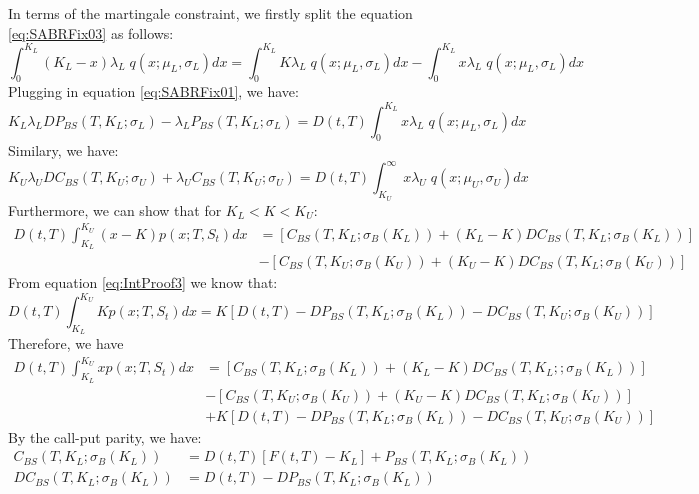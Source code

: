 \documentclass[letterpaper,12pt,titlepage,oneside,final]{book}
\numberwithin{equation}{section}
\theoremstyle{definition}
\begin{document}
In terms of the martingale constraint, we firstly split the equation \eqref {eq:SABRFix03} as follows:
\begin{equation}
	\int_{0}^{K_L} (K_L-x) \lambda_{L} \;  q(x;\mu_{L},\sigma_{L}) dx=\int_{0}^{K_L} K \lambda_{L} \;  q(x;\mu_{L},\sigma_{L}) dx-\int_{0}^{K_L} x \lambda_{L} \;  q(x;\mu_{L},\sigma_{L}) dx
	\label{eq:MatProof1}
\end{equation}
Plugging in equation \eqref{eq:SABRFix01}, we have:
\begin{equation}
	K_L\lambda_{L} DP_{BS}(T,K_{L};\sigma_{L})-\lambda_{L} P_{BS}(T,K_{L};\sigma_{L})=D(t, T)\int_{0}^{K_L} x \lambda_{L} \;  q(x;\mu_{L},\sigma_{L}) dx
	\label{eq:MatProof2}
\end{equation}
Similary, we have:
\begin{equation}
	K_U\lambda_{U} DC_{BS}(T,K_{U};\sigma_{U})+\lambda_{U} C_{BS}(T,K_{U};\sigma_{U})=D(t,T)\int_{K_U}^{\infty} x \lambda_{U} \;  q(x;\mu_{U},\sigma_{U}) dx
	\label{eq:MatProof3}
\end{equation}
Furthermore, we can show that for $K_L<K<K_U$:
\begin{equation}
	\begin{split}
	D(t,T) \int_{K_L}^{K_U} (x-K) p(x;T,S_t)dx&=\left[C_{BS}(T,K_L;\sigma_B(K_L))+(K_L-K)DC_{BS}(T,K_L;\sigma_B(K_L))\right]\\ &-\left[C_{BS}(T,K_U;\sigma_B(K_U))+(K_U-K)DC_{BS}(T,K_L;\sigma_B(K_U))\right]
\end{split}
\end{equation}
From equation \eqref{eq:IntProof3} we know that:
\[
D(t,T) \int_{K_L}^{K_U} K p(x;T,S_t)dx=K[D(t,T)- DP_{BS}(T,K_{L};\sigma_{B}(K_{L}))- DC_{BS}(T,K_{U};\sigma_{B}(K_{U}))]
\]
Therefore, we have
\begin{equation}
\begin{split}
	D(t,T) \int_{K_L}^{K_U} x p(x;T,S_t)dx&=\left[C_{BS}(T,K_L;\sigma_B(K_L))+(K_L-K)DC_{BS}(T,K_L;;\sigma_B(K_L))\right]\\ &-\left[C_{BS}(T,K_U;\sigma_B(K_U))+(K_U-K)DC_{BS}(T,K_L;\sigma_B(K_U))\right]\\
	&+K[D(t,T)- DP_{BS}(T,K_{L};\sigma_{B}(K_{L}))- DC_{BS}(T,K_{U};\sigma_{B}(K_{U}))]
\end{split}
\label{eq:matproof4}
\end{equation}
By the call-put parity, we have:
\begin{equation}	
	\begin{split}
	C_{BS}(T,K_L;\sigma_B(K_L))&=D(t,T)[F(t,T)-K_L]+P_{BS}(T,K_L;\sigma_B(K_L))\\
	DC_{BS}(T,K_L;\sigma_B(K_L))&=D(t,T)-DP_{BS}(T,K_L;\sigma_B(K_L))\\
\end{split}
\label{eq:matproof5}
\end{equation}
\end{document}
